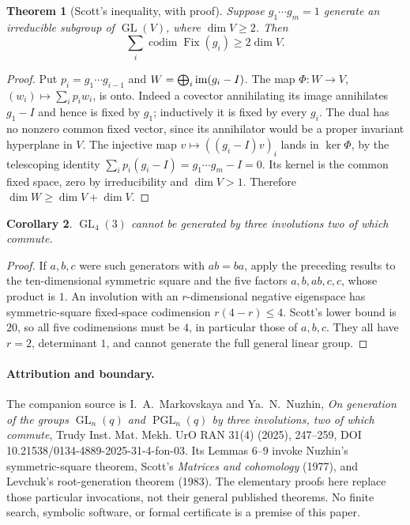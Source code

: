 \documentclass[11pt]{article}
\newtheorem{theorem}{Theorem}\newtheorem{lemma}[theorem]{Lemma}\newtheorem{corollary}[theorem]{Corollary}
\newcommand{\GL}{\operatorname{GL}}\newcommand{\SL}{\operatorname{SL}}
\begin{document}
\begin{theorem}[Scott's inequality, with proof]\label{scott}
Suppose $g_1\cdots g_m=1$ generate an irreducible subgroup of $\GL(V)$,
where $\dim V\geq2$. Then
\[\sum_i\operatorname{codim}\operatorname{Fix}(g_i)\geq2\dim V.\]
\end{theorem}
\begin{proof}
Put $p_i=g_1\cdots g_{i-1}$ and
$W=\bigoplus_i\operatorname{im}(g_i-I)$. The map
$\Phi:W\to V$, $(w_i)\mapsto\sum_i p_iw_i$, is onto.
Indeed a covector annihilating its image annihilates $g_1-I$ and hence is
fixed by $g_1$; inductively it is fixed by every $g_i$. The dual has no
nonzero common fixed vector, since its annihilator would be a proper
invariant hyperplane in $V$.
The injective map $v\mapsto((g_i-I)v)_i$ lands in $\ker\Phi$, by the
telescoping identity $\sum_i p_i(g_i-I)=g_1\cdots g_m-I=0$.
Its kernel is the common fixed space, zero by irreducibility and
$\dim V>1$. Therefore $\dim W\geq\dim V+\dim V$.
\end{proof}

\begin{corollary}\label{gl43}
$\GL_4(3)$ cannot be generated by three involutions two of which commute.
\end{corollary}
\begin{proof}
If $a,b,c$ were such generators with $ab=ba$, apply the preceding results
to the ten-dimensional symmetric square and the five factors
$a,b,ab,c,c$, whose product is $1$. An involution with an $r$-dimensional
negative eigenspace has symmetric-square fixed-space codimension
$r(4-r)\leq4$. Scott's lower bound is $20$, so all five codimensions must
be $4$, in particular those of $a,b,c$. They all have $r=2$, determinant
$1$, and cannot generate the full general linear group.
\end{proof}

\paragraph{Attribution and boundary.}
The companion source is I.~A.~Markovskaya and Ya.~N.~Nuzhin,
\emph{On generation of the groups $\GL_n(q)$ and $\operatorname{PGL}_n(q)$
by three involutions, two of which commute}, Trudy Inst. Mat. Mekh. UrO RAN
31(4) (2025), 247--259, DOI 10.21538/0134-4889-2025-31-4-fon-03.
Its Lemmas 6--9 invoke Nuzhin's symmetric-square theorem, Scott's
\emph{Matrices and cohomology} (1977), and Levchuk's root-generation
theorem (1983). The elementary proofs here replace those particular
invocations, not their general published theorems. No finite search,
symbolic software, or formal certificate is a premise of this paper.
\end{document}
